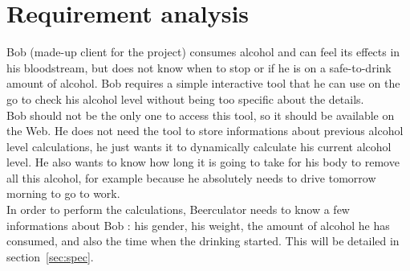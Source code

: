 \section{Requirement analysis}
\label{sec:req}

Bob (made-up client for the project) consumes alcohol and can feel its effects in his bloodstream, but does not know when to stop or if he is on a safe-to-drink amount of alcohol. Bob requires a simple interactive tool that he can use on the go to check his alcohol level without being too specific about the details.\\
  
Bob should not be the only one to access this tool, so it should be available on the Web. He does not need the tool to store informations about previous alcohol level calculations, he just wants it to dynamically calculate his current alcohol level. He also wants to know how long it is going to take for his body to remove all this alcohol, for example because he absolutely needs to drive tomorrow morning to go to work.\\

In order to perform the calculations, Beerculator needs to know a few informations about Bob : his gender, his weight, the amount of alcohol he has consumed, and also the time when the drinking started. This will be detailed in {\sc section}~\ref{sec:spec}.